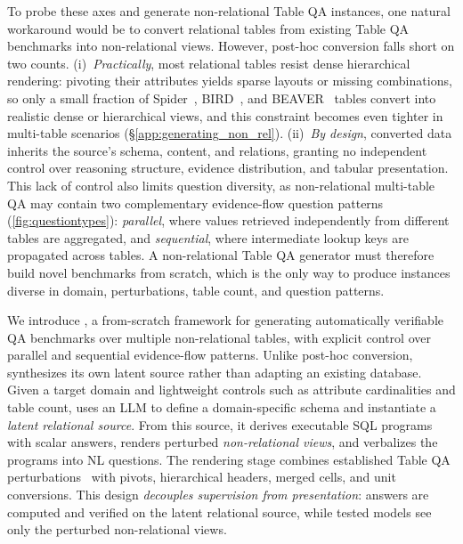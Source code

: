 To probe these axes and generate non-relational Table QA instances, one natural workaround would be to convert relational tables from existing Table QA benchmarks into non-relational views. However, post-hoc conversion falls short on two counts. (i)~\emph{Practically}, most relational tables resist dense hierarchical rendering: pivoting their attributes yields sparse layouts or missing combinations, so only a small fraction of Spider~\cite{1.6}, BIRD~\cite{1.20}, and BEAVER~\cite{1.30} tables convert into realistic dense or hierarchical views, and this constraint becomes even tighter in multi-table scenarios (\S\ref{app:generating_non_rel}). (ii)~\emph{By design}, converted data inherits the source's schema, content, and relations, granting no independent control over reasoning structure, evidence distribution, and tabular presentation. This lack of control also limits question diversity, as non-relational multi-table QA may contain two complementary evidence-flow question patterns (\autoref{fig:questiontypes}): \emph{parallel}, where values retrieved independently from different tables are aggregated, and \emph{sequential}, where intermediate lookup keys are propagated across tables. 
A non-relational Table QA generator must therefore build novel benchmarks from scratch, which is the only way to produce instances diverse in domain, perturbations, table count, and question patterns. %

We introduce \name, a from-scratch framework for generating automatically verifiable QA benchmarks over multiple non-relational tables, with explicit control over parallel and sequential evidence-flow patterns. Unlike post-hoc conversion, \name synthesizes its own latent source rather than adapting an existing database. Given a target domain and lightweight controls such as attribute cardinalities and table count, \name uses an LLM to define a domain-specific schema and instantiate a \emph{latent relational source}. From this source, it derives executable SQL programs with scalar answers, renders perturbed \emph{non-relational views}, and verbalizes the programs into NL questions. The rendering stage combines established Table QA perturbations~\cite{2.4,2.5,2.6,2.8} with pivots, hierarchical headers, merged cells, and unit conversions. This design \emph{decouples supervision from presentation}: answers are computed and verified on the latent relational source, while tested models see only the perturbed non-relational views.

